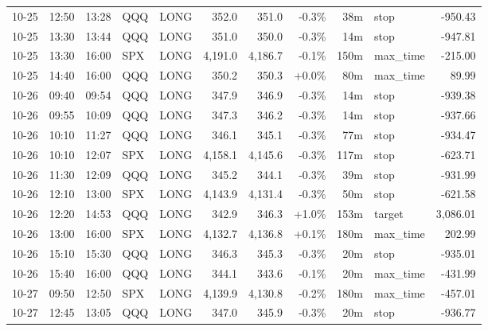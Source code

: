 \documentclass[11pt,a4paper,twoside]{article}
\begin{document}
\begin{center}
\begin{longtable}{>{\color{txtmain}}l l l l l r r r r >{\color{txtmain}}l r}
10-25 & 12:50 & 13:28 & QQQ & LONG & 352.0 & 351.0 & \textcolor{lossred}{-0.3\%} & 38m & stop & \textcolor{lossred}{-950.43} \\
10-25 & 13:30 & 13:44 & QQQ & LONG & 351.0 & 350.0 & \textcolor{lossred}{-0.3\%} & 14m & stop & \textcolor{lossred}{-947.81} \\
10-25 & 13:30 & 16:00 & SPX & LONG & 4,191.0 & 4,186.7 & \textcolor{lossred}{-0.1\%} & 150m & max\_time & \textcolor{lossred}{-215.00} \\
10-25 & 14:40 & 16:00 & QQQ & LONG & 350.2 & 350.3 & \textcolor{wingreen}{+0.0\%} & 80m & max\_time & \textcolor{wingreen}{89.99} \\
10-26 & 09:40 & 09:54 & QQQ & LONG & 347.9 & 346.9 & \textcolor{lossred}{-0.3\%} & 14m & stop & \textcolor{lossred}{-939.38} \\
10-26 & 09:55 & 10:09 & QQQ & LONG & 347.3 & 346.2 & \textcolor{lossred}{-0.3\%} & 14m & stop & \textcolor{lossred}{-937.66} \\
10-26 & 10:10 & 11:27 & QQQ & LONG & 346.1 & 345.1 & \textcolor{lossred}{-0.3\%} & 77m & stop & \textcolor{lossred}{-934.47} \\
10-26 & 10:10 & 12:07 & SPX & LONG & 4,158.1 & 4,145.6 & \textcolor{lossred}{-0.3\%} & 117m & stop & \textcolor{lossred}{-623.71} \\
10-26 & 11:30 & 12:09 & QQQ & LONG & 345.2 & 344.1 & \textcolor{lossred}{-0.3\%} & 39m & stop & \textcolor{lossred}{-931.99} \\
10-26 & 12:10 & 13:00 & SPX & LONG & 4,143.9 & 4,131.4 & \textcolor{lossred}{-0.3\%} & 50m & stop & \textcolor{lossred}{-621.58} \\
10-26 & 12:20 & 14:53 & QQQ & LONG & 342.9 & 346.3 & \textcolor{wingreen}{+1.0\%} & 153m & target & \textcolor{wingreen}{3,086.01} \\
10-26 & 13:00 & 16:00 & SPX & LONG & 4,132.7 & 4,136.8 & \textcolor{wingreen}{+0.1\%} & 180m & max\_time & \textcolor{wingreen}{202.99} \\
10-26 & 15:10 & 15:30 & QQQ & LONG & 346.3 & 345.3 & \textcolor{lossred}{-0.3\%} & 20m & stop & \textcolor{lossred}{-935.01} \\
10-26 & 15:40 & 16:00 & QQQ & LONG & 344.1 & 343.6 & \textcolor{lossred}{-0.1\%} & 20m & max\_time & \textcolor{lossred}{-431.99} \\
10-27 & 09:50 & 12:50 & SPX & LONG & 4,139.9 & 4,130.8 & \textcolor{lossred}{-0.2\%} & 180m & max\_time & \textcolor{lossred}{-457.01} \\
10-27 & 12:45 & 13:05 & QQQ & LONG & 347.0 & 345.9 & \textcolor{lossred}{-0.3\%} & 20m & stop & \textcolor{lossred}{-936.77} \\

\end{longtable}
\end{center}
\end{document}
